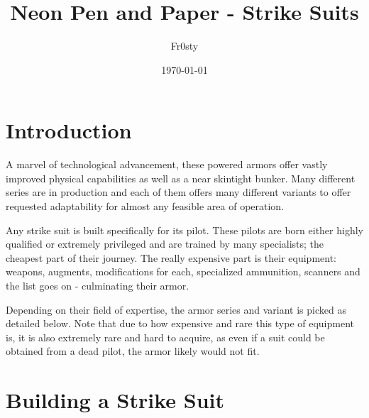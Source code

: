 \documentclass[12pt,a4paper,openany]{book}
\title{Neon Pen and Paper - Strike Suits}
\author{Fr0sty}
\date{\today}
\begin{document}
	
	
	\chapter{Introduction}
	A marvel of technological advancement, these powered armors offer vastly improved physical capabilities as well as a near skintight bunker. Many different series are in production and each of them offers many different variants to offer requested adaptability for almost any feasible area of operation.\par
	Any strike suit is built specifically for its pilot. These pilots are born either highly qualified or extremely privileged and are trained by many specialists; the cheapest part of their journey. The really expensive part is their equipment: weapons, augments, modifications for each, specialized ammunition, scanners and the list goes on - culminating their armor.\par
	Depending on their field of expertise, the armor series and variant is picked as detailed below. Note that due to how expensive and rare this type of equipment is, it is also extremely rare and hard to acquire, as even if a suit could be obtained from a dead pilot, the armor likely would not fit.
	
	\chapter{Building a Strike Suit}
\end{document}
